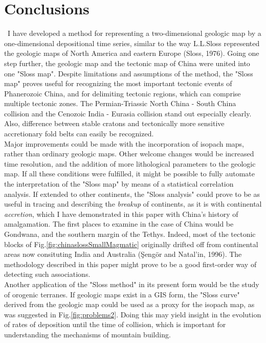 \documentclass{article}
\begin{document}
 \section*{Conclusions} \label{sec:conclusion}

 ~\indent I have developed  a method for representing a two-dimensional
 geologic map  by a one-dimensional depositional  time series, similar
 to the way  L.L.Sloss represented the geologic maps  of North America
 and  eastern  Europe (Sloss,  1976).   Going  one  step further,  the
 geologic  map and  the tectonic  map of  China were  united  into one
 "Sloss map".  Despite limitations and assumptions of  the method, the
 "Sloss map" proves useful for recognizing the most important tectonic
 events  of Phanerozoic  China, and  for delimiting  tectonic regions,
 which  can comprise  multiple tectonic  zones.   The Permian-Triassic
 North China - South China  collision and the Cenozoic India - Eurasia
 collision  stand out  especially clearly.   Also,  difference between
 stable  cratons  and tectonically  more  sensitive accretionary  fold
 belts can easily be recognized.  \\

 Major improvements  could be made  with the incorporation  of isopach
 maps, rather than ordinary geologic maps. Other welcome changes would
 be increased  time resolution, and the addition  of more lithological
 parameters  to  the  geologic  map.  If  all  these  conditions  were
 fulfilled, it might be  possible to fully automate the interpretation
 of the "Sloss map" by means of a statistical correlation analysis. If
 extended to other continents, the  "Sloss analysis" could prove to be
 as useful in tracing and  describing the {\it breakup} of continents,
 as it is with continental  {\it accretion}, which I have demonstrated
 in this paper with China's history of amalgamation.  The first places
 to examine in  the case of China would be  Gondwana, and the southern
 margin  of  the Tethys.   Indeed,  most  of  the tectonic  blocks  of
 Fig.\ref{fig:chinaslossSmallMagmatic}  originally  drifted  off  from
 continental areas now consituting India and Australia (\c{S}eng\"{o}r
 and Natal'in,  1996). The methodology  described in this  paper might
 prove to be a good first-order way of detecting such associations.\\

 Another application of  the "Sloss method" in its  present form would
 be the study  of orogenic terranes.  If geologic maps  exist in a GIS
 form, the "Sloss  curve" derived from the geologic  map could be used
 as   a   proxy  for   the   isopach   map,   as  was   suggested   in
 Fig.\ref{fig:problems2}.   Doing  this   may  yield  insight  in  the
 evolution of rates  of deposition until the time  of collision, which
 is important for understanding the mechanisms of mountain building.
\end{document}
